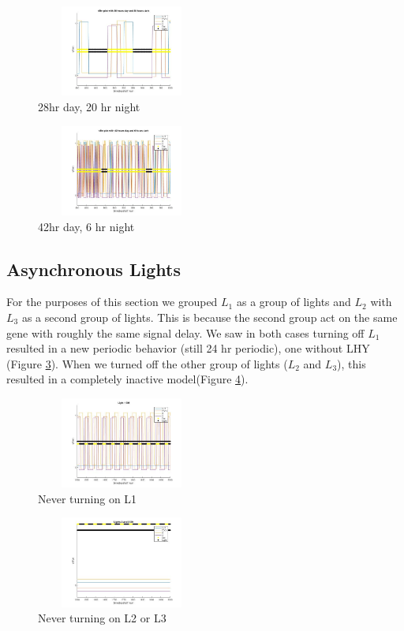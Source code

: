 \documentclass[twoside,twocolumn,9pt]{article}
\begin{document}
\newpage


\begin{figure}[H]
\centering
  \includegraphics[width=0.5\textwidth,height=3cm]{28d-20n}
  \caption{28hr day, 20 hr night}
  \label{fgr:28hr}
\end{figure}
\begin{figure}[H]
\centering
  \includegraphics[width=0.5\textwidth,height=3cm]{42d-6n}
  \caption{42hr day, 6 hr night}
  \label{fgr:42hr}
\end{figure}

\subsection{Asynchronous Lights}
For the purposes of this section we grouped $L_1$ as a group of lights and $L_2$ with $L_3$ as a second group of lights. This is because the second group act on the same gene with roughly the same signal delay. We saw in both cases turning off $L_1$ resulted in a new periodic behavior (still 24 hr periodic), one without LHY (Figure \ref{fgr:noL1}). When we turned off the other group of lights ($L_2$ and $L_3$), this resulted in a completely inactive model(Figure \ref{fgr:noL2L3}). \\
\begin{figure}[H]
\centering
  \includegraphics[width=0.5\textwidth,height=3cm]{NoL1}
  \caption{Never turning on L1}
  \label{fgr:noL1}
\end{figure}
\begin{figure}[H]
\centering
  \includegraphics[width=0.5\textwidth,height=3cm]{NoL2L3}
  \caption{Never turning on L2 or L3}
  \label{fgr:noL2L3}
\end{figure}
\end{document}
